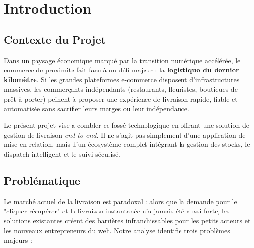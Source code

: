 \newpage

\section{Introduction}

\subsection{Contexte du Projet}
Dans un paysage économique marqué par la transition numérique accélérée, le commerce de proximité fait face à un défi majeur : la \textbf{logistique du dernier kilomètre}. Si les grandes plateformes e-commerce disposent d'infrastructures massives, les commerçants indépendants (restaurants, fleuristes, boutiques de prêt-à-porter) peinent à proposer une expérience de livraison rapide, fiable et automatisée sans sacrifier leurs marges ou leur indépendance.

Le présent projet vise à combler ce fossé technologique en offrant une solution de gestion de livraison \textit{end-to-end}. Il ne s'agit pas simplement d'une application de mise en relation, mais d'un écosystème complet intégrant la gestion des stocks, le dispatch intelligent et le suivi sécurisé.

\subsection{Problématique}
Le marché actuel de la livraison est paradoxal : alors que la demande pour le "cliquer-récupérer" et la livraison instantanée n'a jamais été aussi forte, les solutions existantes créent des barrières infranchissables pour les petits acteurs et les nouveaux entrepreneurs du web. Notre analyse identifie trois problèmes majeurs :

